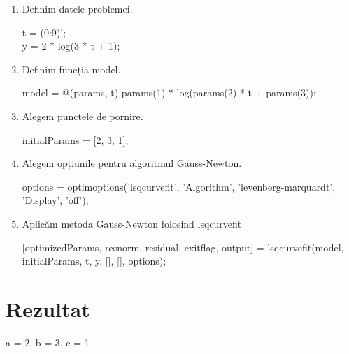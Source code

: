 \documentclass{article}
\begin{document}
\begin{center}
\begin{enumerate}
\item  Definim datele problemei. \\
\begin{center}
t = (0:9)'; \\
y = 2 * log(3 * t + 1); \\
\end{center}
\item Definim funcția model. \\
 \begin{center}
    model = @(params, t) params(1) * log(params(2) * t + params(3));
 \end{center}
\item Alegem punctele de pornire.\\
 \begin{center}
     initialParams = [2, 3, 1];
 \end{center}
 \item Alegem opțiunile pentru algoritmul Gauss-Newton.\\
 \begin{center}
    options = optimoptions('lsqcurvefit', 'Algorithm', 'levenberg-marquardt', 'Display', 'off');
 \end{center}
  \item Aplicăm metoda Gauss-Newton folosind lsqcurvefit\\
 \begin{center}
    [optimizedParams, resnorm, residual, exitflag, output] = lsqcurvefit(model, initialParams, t, y, [], [], options);
 \end{center}
\end{enumerate}
\end{center}

\section*{Rezultat}
\begin{center}
a = 2, b = 3, c = 1
\end{center}
\end{document}
